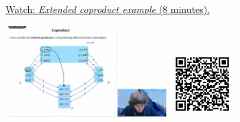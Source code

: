 
\begin{minipage}{10cm}
    \href{https://act4e-spring21.netlify.app/videos/spring2021-coproducts:coproducts:batt-coproduct.html}{Watch: \emph{Extended coproduct example} (8 minutes).}
        
    \href{https://act4e-spring21.netlify.app/videos/spring2021-coproducts:coproducts:batt-coproduct.html}{\includegraphics[height=3.5cm]{spring2021-coproducts:coproducts:batt-coproduct/thumbnails.jpg}}
    \href{https://act4e-spring21.netlify.app/videos/spring2021-coproducts:coproducts:batt-coproduct.html}{\includegraphics[height=2.5cm]{spring2021-coproducts:coproducts:batt-coproduct/qrcode.png}}
\end{minipage}
